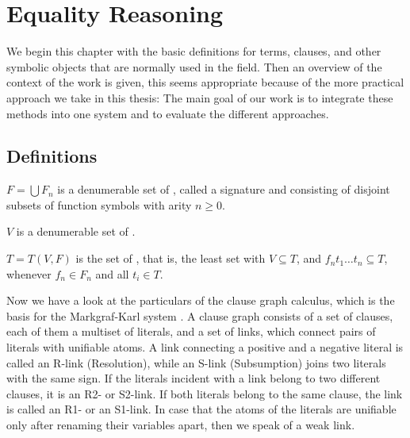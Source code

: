 \chapter{Equality Reasoning}
\label{EqualityReasoning}

We begin this chapter with the basic definitions for terms, clauses, and
other symbolic objects that are normally used in the field. Then an overview of the
context of the work is given, this seems appropriate because of the more 
practical approach we take in this thesis: The main 
goal of our work is to integrate these 
methods into one system and to evaluate the different approaches. 

\section{Definitions}

\begin{Def}

\label{VariablesFunctionsTerms}
\return
$F= \bigcup F_n$ is a denumerable set of , called
a signature and consisting of disjoint subsets of function symbols with
arity $n\geq 0$.

$V$ is a denumerable set of .

$T=T(V, F)$ is the set of , that is, 
the least set with $V \subseteq T$,
and $f_n t_1\dots t_n \subseteq T$, whenever $f_n\in F_n$ and all $t_i\in
T$.
\end{Def}

Now we have a look at the particulars
of the clause graph calculus, which is the basis for
the Markgraf-Karl system \cite{Raph84,OhSi89,EiOhPr89,Eisinger89}. 
A clause graph consists 
of a set of clauses,
each of them a multiset of literals, and a set of links, which connect pairs
of literals with unifiable atoms. A link connecting a positive and a negative
literal is called an R-link (Resolution), while an S-link (Subsumption)
joins two literals with the same sign. If the literals incident with a link
belong to two different clauses, it is an R2- or S2-link. If both literals
belong to the same clause, the link is called an R1- or an S1-link. In case
that the atoms of the literals are unifiable only after renaming
their variables apart, then we speak of a weak link.

